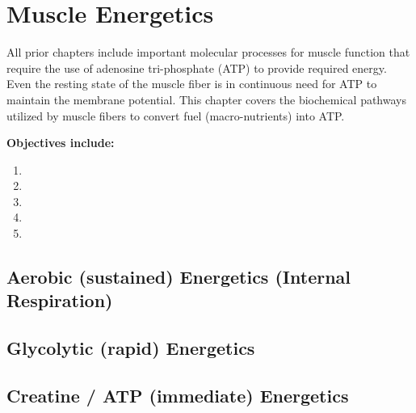 \chapter{Muscle Energetics}\label{chp:energetics}

\minitoc

All prior chapters include important molecular processes for muscle function that require the use of adenosine tri-phosphate (ATP) to provide required energy. Even the resting state of the muscle fiber is in continuous need for ATP to maintain the membrane potential. This chapter covers the biochemical pathways utilized by muscle fibers to convert fuel (macro-nutrients) into ATP.

\vspace{5mm}

\textbf{Objectives include:}
\begin{enumerate}
    \item
    \item
    \item
    \item
    \item
\end{enumerate}

\section{Aerobic (sustained) Energetics (Internal Respiration)}

\section{Glycolytic (rapid) Energetics}

\section{Creatine / ATP (immediate) Energetics}

\printbibliography[heading=subbibintoc]